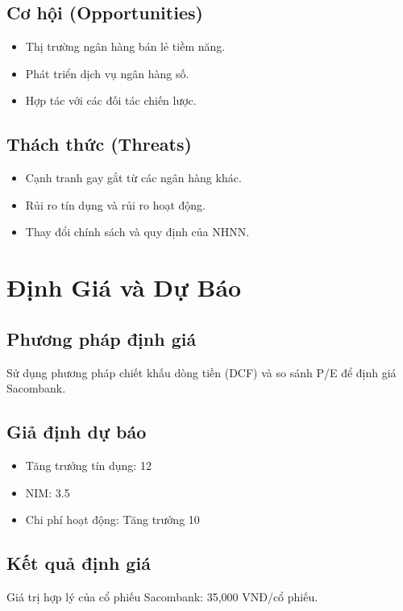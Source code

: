 \documentclass[11pt]{article}
\begin{document}
\subsection{Cơ hội (Opportunities)}
\begin{itemize}
    \item Thị trường ngân hàng bán lẻ tiềm năng.
    \item Phát triển dịch vụ ngân hàng số.
    \item Hợp tác với các đối tác chiến lược.
\end{itemize}

\subsection{Thách thức (Threats)}
\begin{itemize}
    \item Cạnh tranh gay gắt từ các ngân hàng khác.
    \item Rủi ro tín dụng và rủi ro hoạt động.
    \item Thay đổi chính sách và quy định của NHNN.
\end{itemize}

\section{Định Giá và Dự Báo}

\subsection{Phương pháp định giá}
Sử dụng phương pháp chiết khấu dòng tiền (DCF) và so sánh P/E để định giá Sacombank.

\subsection{Giả định dự báo}
\begin{itemize}
    \item Tăng trưởng tín dụng: 12%
    \item NIM: 3.5%
    \item Chi phí hoạt động: Tăng trưởng 10%
\end{itemize}

\subsection{Kết quả định giá}
Giá trị hợp lý của cổ phiếu Sacombank: 35,000 VNĐ/cổ phiếu.
\end{document}
